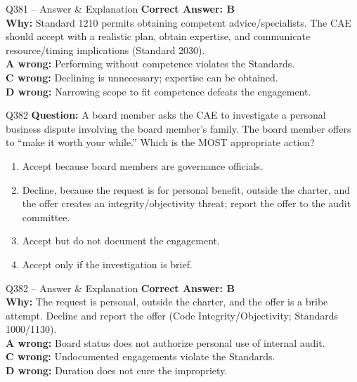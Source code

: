 \documentclass[aspectratio=169,10pt]{beamer}
\begin{document}
	\begin{frame}[t]{Q381 -- Answer \& Explanation}
		\small
		\textbf{Correct Answer: B} \\[4pt]
		\textbf{Why:} Standard 1210 permits obtaining competent advice/specialists. The CAE should accept with a realistic plan, obtain expertise, and communicate resource/timing implications (Standard 2030). \\[4pt]
		\textbf{A wrong:} Performing without competence violates the Standards. \\[2pt]
		\textbf{C wrong:} Declining is unnecessary; expertise can be obtained. \\[2pt]
		\textbf{D wrong:} Narrowing scope to fit competence defeats the engagement.
	\end{frame}
	
	\begin{frame}[t]{Q382}
		\small
		\textbf{Question:} A board member asks the CAE to investigate a personal business dispute involving the board member's family. The board member offers to ``make it worth your while.'' Which is the MOST appropriate action?
		\begin{enumerate}[label=\Alph*.,itemsep=1pt,topsep=2pt]
			\item Accept because board members are governance officials.
			\item Decline, because the request is for personal benefit, outside the charter, and the offer creates an integrity/objectivity threat; report the offer to the audit committee.
			\item Accept but do not document the engagement.
			\item Accept only if the investigation is brief.
		\end{enumerate}
	\end{frame}
	
	\begin{frame}[t]{Q382 -- Answer \& Explanation}
		\small
		\textbf{Correct Answer: B} \\[4pt]
		\textbf{Why:} The request is personal, outside the charter, and the offer is a bribe attempt. Decline and report the offer (Code Integrity/Objectivity; Standards 1000/1130). \\[4pt]
		\textbf{A wrong:} Board status does not authorize personal use of internal audit. \\[2pt]
		\textbf{C wrong:} Undocumented engagements violate the Standards. \\[2pt]
		\textbf{D wrong:} Duration does not cure the impropriety.
	\end{frame}
	
\end{document}
